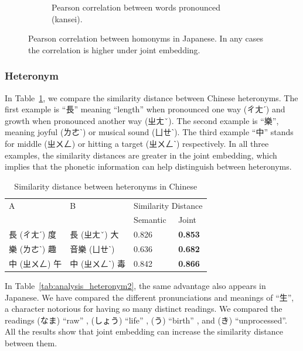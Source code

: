 \begin{figure}[t]
\begin{subfigure}[b]{0.49\textwidth}
        \caption{Pearson correlation between words pronounced (kansei).}
        \label{fig:corr_ja3}
    \end{subfigure}
    \caption{Pearson correlation between homonyms in Japanese.  In any cases the correlation is higher under joint embedding.}
    \label{fig:corr_ja}
\end{figure}

\newpage

\subsubsection{Heteronym}

In Table~\ref{tab:analysis_heteronym1}, we compare the similarity distance between Chinese heteronyms.  The first example is ``長'' meaning ``length'' when pronounced one way (ㄔㄤˊ) and growth when pronounced another way (ㄓㄤˇ).  The second example is ``樂'', meaning joyful (ㄌㄜˋ) or musical sound (ㄩㄝˋ).  The third example ``中'' stands for middle (ㄓㄨㄥ) or hitting a target (ㄓㄨㄥˋ) respectively. In all three examples, the similarity distances are greater in the joint embedding, which implies that the phonetic information can help distinguish between heteronyms.

\vspace{0.5cm}
\begin{table}[h]
    \centering
        \begin{tabularx}{\textwidth}{bbbb}
            \toprule
            \multirow{2.5}{*}{A} & \multirow{2.5}{*}{B} & \multicolumn{2}{c}{Similarity Distance} \\
            \cmidrule(lr){3-4} {} & {} & Semantic & Joint \\\midrule
            長 (ㄔㄤˊ) 度 & 長 (ㄓㄤˇ) 大 & 0.826 & \textbf{0.853} \\
            樂 (ㄌㄜˋ) 趣 & 音樂 (ㄩㄝˋ) & 0.636 & \textbf{0.682} \\
            中 (ㄓㄨㄥ) 午 & 中 (ㄓㄨㄥˋ) 毒 & 0.842 & \textbf{0.866} \\\bottomrule
        \end{tabularx}
    \caption{Similarity distance between heteronyms in Chinese}
    \label{tab:analysis_heteronym1}
\end{table}

\newpage

\begin{CJK}{UTF8}{ipxm}
    In Table~\ref{tab:analysis_heteronym2}, the same advantage also appears in Japanese. We have compared the different pronunciations and meanings of ``生'', a character notorious for having so many distinct readings.  We compared the readings (なま) ``raw'' , (しょう) ``life'' , (う) ``birth'' , and (き) ``unprocessed''. All the results show that joint embedding can increase the similarity distance between them.
\end{CJK}

